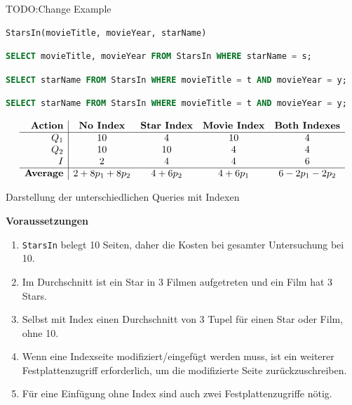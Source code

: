 TODO:Change Example
\begin{lstlisting}[caption=Tabelle StarsIn Deklaration,label=declaration-starsin]
StarsIn(movieTitle, movieYear, starName)
\end{lstlisting}

\begin{lstlisting}[language=SQL,caption=Select-Query 1 für Stars in,label=starsin-select-query-1]
SELECT movieTitle, movieYear FROM StarsIn WHERE starName = s;
\end{lstlisting}

\begin{lstlisting}[language=SQL,caption=Select-Query 2 für Stars in,label=starsin-select-query-2]
SELECT starName FROM StarsIn WHERE movieTitle = t AND movieYear = y;
\end{lstlisting}

\begin{lstlisting}[language=SQL,caption=Insert-Query 2 für Stars in,label=starsin-insert-query]
SELECT starName FROM StarsIn WHERE movieTitle = t AND movieYear = y;
\end{lstlisting}

\begin{table}[h!]
    \centering
    \setlength{\arrayrulewidth}{0.4mm}
    \[
        \begin{array}{r|c c c c}
            \textbf{Action} & \textbf{No Index} & \textbf{Star Index} & \textbf{Movie Index} & \textbf{Both Indexes} \\ \hline
            Q_1 & 10 & 4 & 10 & 4 \\
            Q_2 & 10 & 10 & 4 & 4 \\
            I   & 2  & 4  & 4  & 6 \\ \hline
            \textbf{Average} & 2 + 8p_1 + 8p_2 & 4 + 6p_2 & 4 + 6p_1 & 6 - 2p_1 - 2p_2 \\
        \end{array}
    \]
    \caption[Performance-Vergleich]{Darstellung der unterschiedlichen Queries mit Indexen}
    \label{tab:performance-queries}
\end{table}

\textbf{Voraussetzungen}
\begin{enumerate}
    \item \texttt{StarsIn} belegt 10 Seiten, daher die Kosten bei gesamter Untersuchung bei 10.
    \item Im Durchschnitt ist ein Star in 3 Filmen aufgetreten und ein Film hat 3 Stars.
    \item Selbst mit Index einen Durchschnitt von 3 Tupel für einen Star oder Film, ohne 10.
    \item Wenn eine Indexseite modifiziert/eingefügt werden muss, ist ein weiterer Festplattenzugriff erforderlich, um die modifizierte Seite zurückzuschreiben.
    \item Für eine Einfügung ohne Index sind auch zwei Festplattenzugriffe nötig.
\end{enumerate}

